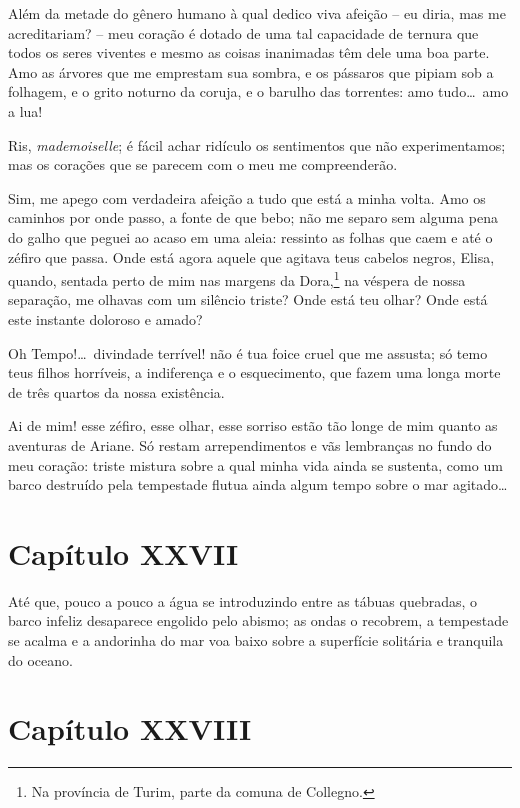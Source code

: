   Além da metade do gênero humano à qual dedico viva afeição -- eu
diria, mas me acreditariam? -- meu coração é dotado de uma tal
capacidade de ternura que todos os seres viventes e mesmo as coisas
inanimadas têm dele uma boa parte. Amo as árvores que me emprestam sua
sombra, e os pássaros que pipiam sob a folhagem, e o grito noturno da
coruja, e o barulho das torrentes: amo tudo\ldots\ amo a lua!

 Ris, \textit{mademoiselle}; é fácil achar ridículo os sentimentos que
não experimentamos; mas os corações que se parecem com o meu me
compreenderão.

 Sim, me apego com verdadeira afeição a tudo que está a minha volta. Amo
os caminhos por onde passo, a fonte de que bebo; não me separo sem
alguma pena do galho que peguei ao acaso em uma aleia: ressinto as
folhas que caem e até o zéfiro que passa. Onde está agora aquele que
agitava teus cabelos negros, Elisa, quando, sentada perto de mim nas
margens da Dora,\footnote{ Na província de Turim, parte da comuna de
Collegno.} na véspera de nossa separação, me olhavas com um silêncio
triste? Onde está teu olhar? Onde está este instante doloroso e amado?

 Oh Tempo!\ldots\ divindade terrível! não é tua foice cruel que me assusta;
só temo teus filhos horríveis, a indiferença e o esquecimento, que
fazem uma longa morte de três quartos da nossa existência. 

 Ai de mim! esse zéfiro, esse olhar, esse sorriso estão tão longe de mim
quanto as aventuras de Ariane. Só restam arrependimentos e vãs
lembranças no fundo do meu coração: triste mistura sobre a qual minha
vida ainda se sustenta, como um barco destruído pela tempestade flutua
ainda algum tempo sobre o mar agitado\ldots

\section{Capítulo XXVII}

 Até que, pouco a pouco a água se introduzindo entre as tábuas
quebradas, o barco infeliz desaparece engolido pelo abismo; as ondas o
recobrem, a tempestade se acalma e a andorinha do mar voa baixo sobre a
superfície solitária e tranquila do oceano.

\section{Capítulo XXVIII}

